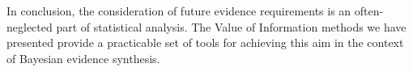 \documentclass[12pt]{article}\usepackage[]{graphicx}\usepackage[]{color}
\begin{document}
In conclusion, the consideration of future evidence requirements is an often-neglected part of statistical analysis.  The Value of Information methods we have presented provide a practicable set of tools for achieving this aim in the context of Bayesian evidence synthesis.


\appendix







\end{document}
